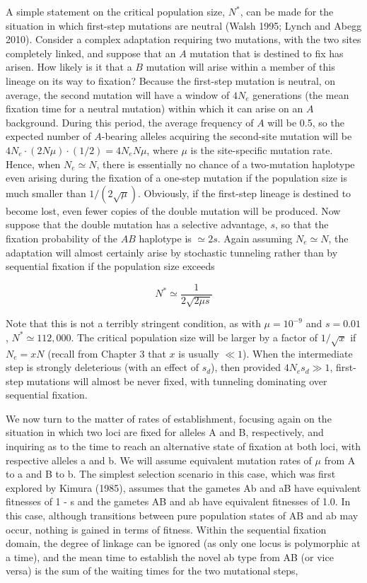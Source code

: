 \documentclass{article}
\begin{document}
A simple statement on the critical population size, $N^{*}$, can be made for the situation in which first-step mutations are neutral (Walsh 1995; Lynch and Abegg 2010). Consider a complex adaptation requiring two mutations, with the two sites completely linked, and suppose that an $A$ mutation that is destined to fix has arisen. How likely is it that a $B$ mutation will arise within a member of this lineage on its way to fixation? Because the first-step mutation is neutral, on average, the second mutation will have a window of $4N_e$ generations (the mean fixation time for a neutral mutation) within which it can arise on an $A$ background. During this period, the average frequency of $A$ will be 0.5, so the expected number of $A$-bearing alleles acquiring the second-site mutation will be $4N_e \cdot (2N\mu) \cdot (1/2) = 4N_eN\mu$, where $\mu$ is the site-specific mutation rate. Hence, when $N_e \simeq N$, there is essentially no chance of a two-mutation haplotype even arising during the fixation of a one-step mutation if the population size is much smaller than $1/(2\sqrt{\mu})$. Obviously, if the first-step lineage is destined to become lost, even fewer copies of the double mutation will be produced. Now suppose that the double mutation has a selective advantage, $s$, so that the fixation probability of the $AB$ haplotype is $\simeq 2s$. Again assuming $N_e \simeq N$, the adaptation will almost certainly arise by stochastic tunneling rather than by sequential fixation if the population size exceeds

\begin{equation}
N^{*}\simeq\frac{1}{2\sqrt{2\mu s}}
\tag{7.45}
\label{eq:7_45}
\end{equation}

Note that this is not a terribly stringent condition, as with  $ \mu = 10^{-9} $ and  $ s = 0.01 $,  $ N^* \simeq 112,000 $. The critical population size will be larger by a factor of  $ 1/\sqrt{x} $ if  $ N_e = xN $ (recall from Chapter 3 that  $ x $ is usually  $ \ll 1 $). When the intermediate step is strongly deleterious (with an effect of  $ s_d $), then provided  $ 4N_e s_d \gg 1 $, first-step mutations will almost be never fixed, with tunneling dominating over sequential fixation.

We now turn to the matter of rates of establishment, focusing again on the situation in which two loci are fixed for alleles A and B, respectively, and inquiring as to the time to reach an alternative state of fixation at both loci, with respective alleles a and b. We will assume equivalent mutation rates of  $ \mu $ from A to a and B to b. The simplest selection scenario in this case, which was first explored by Kimura (1985), assumes that the gametes Ab and aB have equivalent fitnesses of 1 - s and the gametes AB and ab have equivalent fitnesses of 1.0. In this case, although transitions between pure population states of AB and ab may occur, nothing is gained in terms of fitness. Within the sequential fixation domain, the degree of linkage can be ignored (as only one locus is polymorphic at a time), and the mean time to establish the novel ab type from AB (or vice versa) is the sum of the waiting times for the two mutational steps,
\end{document}
